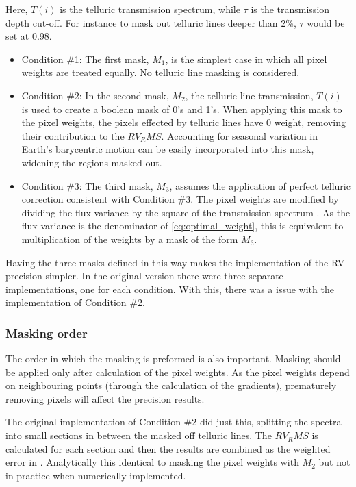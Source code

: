 Here, \(T(i)\) is the telluric transmission spectrum, while \(\tau\) is the transmission depth cut-off. For instance to mask out telluric lines deeper than 2\%,  \(\tau\) would be set at 0.98.

\begin{itemize}
    \item Condition \#1:
    The first mask, \(M_1\), is the simplest case in which all pixel weights are treated equally. No telluric line masking is considered.

    \item Condition \#2:
    In the second mask, \(M_2\), the telluric line transmission, \(T(i)\) is used to create a boolean mask of 0's and 1's. When applying this mask to the pixel weights, the pixels effected by telluric lines have 0 weight, removing their contribution to the {\red{} \(RV_RMS\)}. Accounting for seasonal variation in Earth's barycentric motion can be easily incorporated into this mask, widening the regions masked out.

    \item Condition \#3:
    The third mask, \(M_3\), assumes the application of perfect telluric correction consistent with Condition \#3. The pixel weights are modified by dividing the flux variance by the square of the transmission spectrum . As the flux variance is the denominator of \ref{eq:optimal_weight}, this is equivalent to multiplication of the weights by a mask of the form \(M_3\).
\end{itemize}

Having the three masks defined in this way makes the implementation of the RV precision simpler. In the original version there were three separate implementations, one for each condition. With this,  there was a issue with the implementation of Condition \#2.

\subsubsection{Masking order}
\label{subsubsec:masking_order}
The order in which the masking is preformed is also important. Masking should be applied only after calculation of the pixel weights. As the pixel weights depend on neighbouring points (through the calculation of the gradients), prematurely removing pixels will affect the precision results.

The original implementation of Condition \#2 did just this, splitting the spectra into small sections in between the masked off telluric lines. The {\red{}\(RV_RMS\)} is calculated for each section and then the results are combined as the weighted error in {\red{} } . Analytically this identical to masking the pixel weights with \(M_2\) but not in practice when numerically implemented. 

